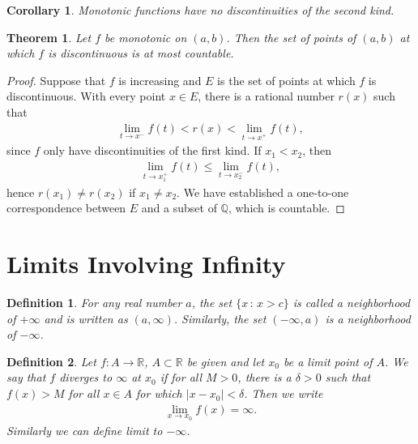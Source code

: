 \documentclass[11pt]{book}
\newtheorem{definition}{Definition}[chapter]
\newtheorem{theorem}{Theorem}[chapter]
\newtheorem{corollary}{Corollary}[theorem]
\theoremstyle{definition}
\numberwithin{equation}{chapter}
\begin{document}
\medskip

\begin{corollary}
Monotonic functions have no discontinuities of the second kind.
\end{corollary}

\medskip

\begin{theorem}
Let $f$ be monotonic on $(a,b)$. Then the set of points of $(a,b)$ at which $f$ is discontinuous is at most countable.
\end{theorem}
\begin{proof}
Suppose that $f$ is increasing and $E$ is the set of points at which $f$ is discontinuous. With every point $x \in E$, there is a rational number $r(x)$ such that 
\begin{align*}
    \lim_{t\to x^-} f(t) < r(x) < \lim_{t\to x^+} f(t),
\end{align*}
since $f$ only have discontinuities of the first kind. If $x_1 < x_2$, then
\begin{align*}
    \lim_{t\to x_1^+} f(t) \leq \lim_{t\to x_2^-} f(t),
\end{align*}
hence $r(x_1) \neq r(x_2)$ if $x_1 \neq x_2$. We have established a one-to-one correspondence between $E$ and a subset of $\mathbb{Q}$, which is countable.
\end{proof}

\medskip

\section{Limits Involving Infinity}

\begin{definition}
For any real number $a$, the set $\{x \,:\, x > c\}$ is called a neighborhood of $+ \infty$ and is written as $(a, \infty)$. Similarly, the set $(- \infty, a)$ is a neighborhood of $- \infty$.
\end{definition}

\medskip

\begin{definition}
Let $f: A \to \mathbb{R}$, $A \subset \mathbb{R}$ be given and let $x_0$ be a limit point of $A$. We say that $f$ diverges to $\infty$ at $x_0$ if for all $M > 0$, there is a $\delta > 0$ such that $f(x) > M$ for all $x \in A$ for which $\left|x - x_0\right| < \delta$. Then we write
\begin{align*}
    \lim_{x \to x_0} f(x) = \infty.
\end{align*}
Similarly we can define limit to $- \infty$.
\end{definition}
\end{document}
